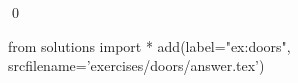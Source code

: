 
    \begin{ex}
  \label{ex:doors}
  
  \qed
\end{ex}
\begin{python0}
from solutions import *
add(label="ex:doors",
    srcfilename='exercises/doors/answer.tex') 
\end{python0}                              
